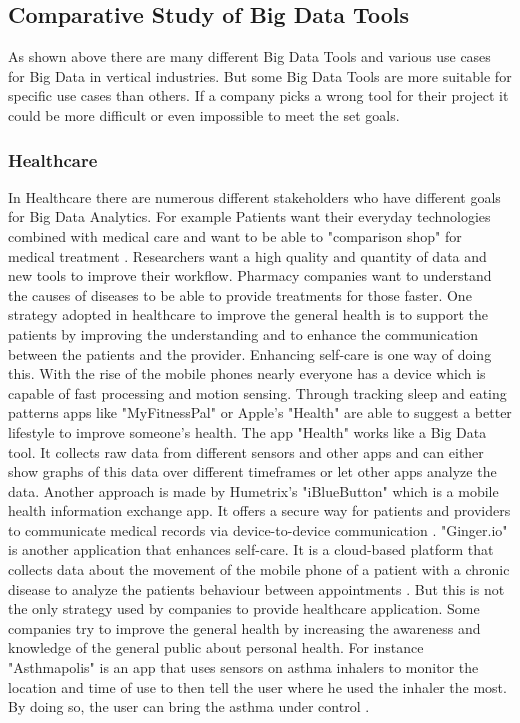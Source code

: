 \documentclass[runningheads]{llncs}
\begin{document}
\subsection{Comparative Study of Big Data Tools}
As shown above there are many different Big Data Tools and various use cases for Big Data in vertical industries. But some Big Data Tools are more suitable for specific use cases than others. If a company picks a wrong tool for their project it could be more difficult or even impossible to meet the set goals.

\subsubsection{Healthcare}
In Healthcare there are numerous different stakeholders who have different goals for Big Data Analytics. For example Patients want their everyday technologies combined with medical care and want to be able to "comparison shop" for medical treatment \cite{FELDMAN}. Researchers want a high quality and quantity of data and new tools to improve their workflow. Pharmacy companies want to understand the causes of diseases to be able to provide treatments for those faster.
One strategy adopted in healthcare to improve the general health is to support the patients by improving the understanding and to enhance the communication between the patients and the provider. Enhancing self-care is one way of doing this. With the rise of the mobile phones nearly everyone has a device which is capable of fast processing and motion sensing. Through tracking sleep and eating patterns apps like "MyFitnessPal" or Apple's "Health" are able to suggest a better lifestyle to improve someone's health. The app "Health" works like a Big Data tool. It collects raw data from different sensors and other apps and can either show graphs of this data over different timeframes or let other apps analyze the data. 
Another approach is made by Humetrix's "iBlueButton" which is a mobile health information exchange app. It offers a secure way for patients and providers to communicate medical records via device-to-device communication \cite{FELDMAN}. "Ginger.io" is another application that enhances self-care. It is a cloud-based platform that collects data about the movement of the mobile phone of a patient with a chronic disease to analyze the patients behaviour between appointments \cite{FELDMAN}. 
But this is not the only strategy used by companies to provide healthcare application. Some companies try to improve the general health by increasing the awareness and knowledge of the general public about personal health. For instance "Asthmapolis" is an app that uses sensors on asthma inhalers to monitor the location and time of use to then tell the user where he used the inhaler the most. By doing so, the user can bring the asthma under control \cite{FELDMAN}. 
\end{document}

